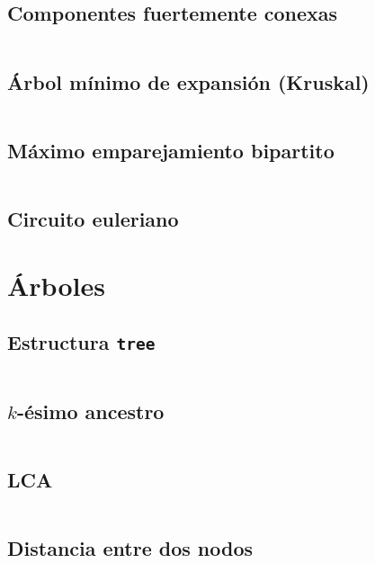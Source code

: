 \documentclass[11pt]{article}
\begin{document}
		\subsection{Componentes fuertemente conexas}
		\inputminted[tabsize=2,breaklines,firstline=306,lastline=335,fontsize=\small]{c++}{graph.cpp}
		
		\subsection{Árbol mínimo de expansión (Kruskal)}
		\inputminted[tabsize=2,breaklines,firstline=337,lastline=353,fontsize=\small]{c++}{graph.cpp}
		
		\subsection{Máximo emparejamiento bipartito}
		\inputminted[tabsize=2,breaklines,firstline=355,lastline=409,fontsize=\small]{c++}{graph.cpp}
		
		\subsection{Circuito euleriano}
		
		
	\newpage
	\section{Árboles}		
		\subsection{Estructura \texttt{tree}}
		\inputminted[tabsize=2,breaklines,firstline=432,lastline=470,fontsize=\small]{c++}{graph.cpp}
		
		\subsection{$k$-ésimo ancestro}
		\inputminted[tabsize=2,breaklines,firstline=472,lastline=484,fontsize=\small]{c++}{graph.cpp}
		
		\subsection{LCA}
		\inputminted[tabsize=2,breaklines,firstline=486,lastline=505,fontsize=\small]{c++}{graph.cpp}
		
		\subsection{Distancia entre dos nodos}
		\inputminted[tabsize=2,breaklines,firstline=507,lastline=530,fontsize=\small]{c++}{graph.cpp}
		
\end{document}
